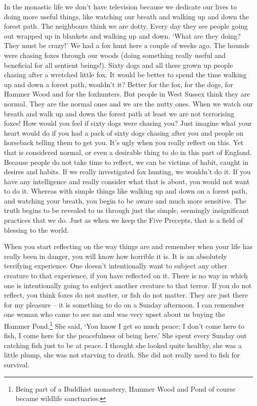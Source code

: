 In the monastic life we don't have television because we dedicate our lives to doing more useful things, like watching our breath and walking up and down the forest path. The neighbours think we are dotty. Every day they see people going out wrapped up in blankets and walking up and down. `What are they doing? They must be crazy!' We had a fox hunt here a couple of weeks ago. The hounds were chasing foxes through our woods (doing something really useful and beneficial for all sentient beings!). Sixty dogs and all these grown up people chasing after a wretched little fox. It would be better to spend the time walking up and down a forest path, wouldn't it? Better for the fox, for the dogs, for Hammer Wood and for the foxhunters. But people in West Sussex think they are normal. They are the normal ones and we are the nutty ones. When we watch our breath and walk up and down the forest path at least we are not terrorising foxes! How would you feel if sixty dogs were chasing you? Just imagine what your heart would do if you had a pack of sixty dogs chasing after you and people on horseback telling them to get you. It's ugly when you really reflect on this. Yet that is considered normal, or even a desirable thing to do in this part of England. Because people do not take time to reflect, we can be victims of habit, caught in desires and habits. If we really investigated fox hunting, we wouldn't do it. If you have any intelligence and really consider what that is about, you would not want to do it. Whereas with simple things like walking up and down on a forest path, and watching your breath, you begin to be aware and much more sensitive. The truth begins to be revealed to us through just the simple, seemingly insignificant practices that we do. Just as when we keep the Five Precepts, that is a field of blessing to the world.

When you start reflecting on the way things are and remember when your life has really been in danger, you will know how horrible it is. It is an absolutely terrifying experience. One doesn't intentionally want to subject any other creature to that experience, if you have reflected on it. There is no way in which one is intentionally going to subject another creature to that terror. If you do not reflect, you think foxes do not matter, or fish do not matter. They are just there for my pleasure -- it is something to do on a Sunday afternoon. I can remember one woman who came to see me and was very upset about us buying the Hammer Pond.\footnote{Being part of a Buddhist monastery, Hammer Wood and Pond of course became wildlife sanctuaries.} She said, `You know I get so much peace; I don't come here to fish, I come here for the peacefulness of being here.' She spent every Sunday out catching fish just to be at peace. I thought she looked quite healthy, she was a little plump, she was not starving to death. She did not really need to fish for survival.

